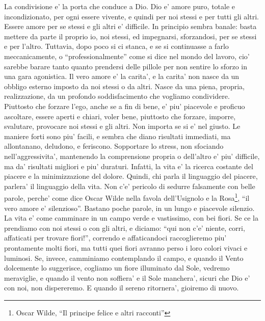 La condivisione e' la porta che conduce a Dio. Dio e' amore puro, totale e incondizionato, per ogni essere vivente, e quindi per noi stessi e per tutti gli altri.
Essere amore per se stessi e gli altri e' difficile. In principio sembra banale: basta mettere da parte il proprio io, noi stessi, ed impegnarsi, sforzandosi, per se stessi e per l'altro. Tuttavia, dopo poco si ci stanca, e se si continuasse a farlo meccanicamente, o ``professionalmente'' come si dice nel mondo del lavoro, cio' sarebbe barare tanto quanto prendersi delle pillole per non sentire lo sforzo in una gara agonistica.
Il vero amore e' la carita', e la carita' non nasce da un obbligo esterno imposto da noi stessi o da altri. Nasce da una piena, propria, realizzazione, da un profondo soddisfacimento che vogliamo condividere.
Piuttosto che forzare l'ego, anche se a fin di bene, e' piu' piacevole e proficuo ascoltare, essere aperti e chiari, voler bene, piuttosto che forzare, imporre, svalutare, provocare noi stessi e gli altri. Non importa se si e' nel giusto. Le maniere forti sono piu' facili, e sembra che diano risultati immediati, ma allontanano, deludono, e feriscono. Sopportare lo stress, non sfociando nell'aggressivita', mantenendo la comprensione propria o dell'altro e' piu' difficile, ma da' risultati migliori e piu' duraturi. Infatti, la vita e' la ricerca costante del piacere e la minimizzazione del dolore. Quindi, chi parla il linguaggio del piacere, parlera' il linguaggio della vita. Non c'e' pericolo di sedurre falsamente con belle parole, perche' come dice Oscar Wilde nella favola dell'Usignolo e la Rosa\footnote{Oscar Wilde, ``Il principe felice e altri racconti''}, ``il vero amore e' silenzioso''. Bastano poche parole, in un lungo e piacevole silenzio.
La vita e' come camminare in un campo verde e vastissimo, con bei fiori. Se ce la prendiamo con noi stessi o con gli altri, e diciamo: ``qui non c'e' niente, corri, affaticati per trovare fiori!'', correndo e affaticandoci raccoglieremo piu' prontamente molti fiori, ma tutti quei fiori avranno perso i loro colori vivaci e luminosi. Se, invece, camminiamo contemplando il campo, e quando il Vento dolcemente lo suggerisce, cogliamo un fiore illuminato dal Sole, vedremo meraviglie, e quando il vento non soffiera' e il Sole manchera', sicuri che Dio e' con noi, non dispereremo. E quando il sereno ritornera', gioiremo di nuovo.

